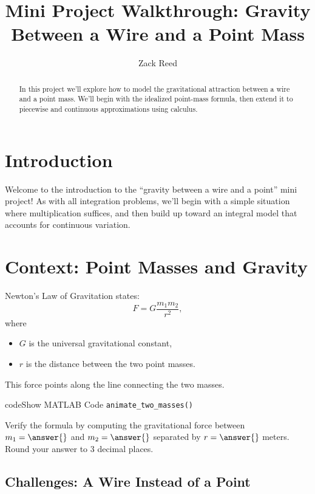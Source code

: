 \documentclass{ximera}
\title{Mini Project Walkthrough: Gravity Between a Wire and a Point Mass}
\author{Zack Reed}
\begin{document}
\begin{abstract}
In this project we'll explore how to model the gravitational attraction between a wire and a point mass. We'll begin with the idealized point-mass formula, then extend it to piecewise and continuous approximations using calculus.
\end{abstract}
\maketitle

\section*{Introduction}

Welcome to the introduction to the ``gravity between a wire and a point'' mini project!  
As with all integration problems, we'll begin with a simple situation where multiplication suffices, and then build up toward an integral model that accounts for continuous variation.

\section*{Context: Point Masses and Gravity}

Newton's Law of Gravitation states:
\[
F = G \frac{m_1 m_2}{r^2},
\]
where
\begin{itemize}
\item $G$ is the universal gravitational constant,
\item $r$ is the distance between the two point masses.
\end{itemize}

This force points along the line connecting the two masses.

\begin{expandable}{code}{Show MATLAB Code}
\texttt{animate\_two\_masses()}
\end{expandable}

\begin{problem}
Verify the formula by computing the gravitational force between $m_1=\answer{}$ and $m_2=\answer{}$ separated by $r=\answer{}$ meters.  
Round your answer to 3 decimal places.
\end{problem}

\subsection*{Challenges: A Wire Instead of a Point}
\end{document}
